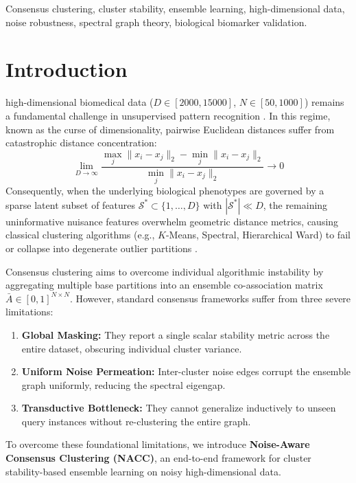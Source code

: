\documentclass[journal]{IEEEtran}
\begin{document}
\begin{IEEEkeywords}
Consensus clustering, cluster stability, ensemble learning, high-dimensional data, noise robustness, spectral graph theory, biological biomarker validation.
\end{IEEEkeywords}

\section{Introduction}
 high-dimensional biomedical data ($D \in [2000, 15000]$, $N \in [50, 1000]$) remains a fundamental challenge in unsupervised pattern recognition \cite{monti2003consensus, golub1999molecular}. In this regime, known as the curse of dimensionality, pairwise Euclidean distances suffer from catastrophic distance concentration:
\begin{equation}
\lim_{D \to \infty} \frac{\max_{j} \|x_i - x_j\|_2 - \min_{j} \|x_i - x_j\|_2}{\min_{j} \|x_i - x_j\|_2} \to 0
\end{equation}
Consequently, when the underlying biological phenotypes are governed by a sparse latent subset of features $\mathcal{S}^* \subset \{1, \dots, D\}$ with $|\mathcal{S}^*| \ll D$, the remaining uninformative nuisance features overwhelm geometric distance metrics, causing classical clustering algorithms (e.g., $K$-Means, Spectral, Hierarchical Ward) to fail or collapse into degenerate outlier partitions \cite{von2007tutorial}.

Consensus clustering \cite{monti2003consensus, strehl2002cluster} aims to overcome individual algorithmic instability by aggregating multiple base partitions into an ensemble co-association matrix $\bar{A} \in [0, 1]^{N \times N}$. However, standard consensus frameworks suffer from three severe limitations:
\begin{enumerate}
    \item \textbf{Global Masking:} They report a single scalar stability metric across the entire dataset, obscuring individual cluster variance.
    \item \textbf{Uniform Noise Permeation:} Inter-cluster noise edges corrupt the ensemble graph uniformly, reducing the spectral eigengap.
    \item \textbf{Transductive Bottleneck:} They cannot generalize inductively to unseen query instances without re-clustering the entire graph.
\end{enumerate}

To overcome these foundational limitations, we introduce \textbf{Noise-Aware Consensus Clustering (NACC)}, an end-to-end framework for cluster stability-based ensemble learning on noisy high-dimensional data.
\end{document}
